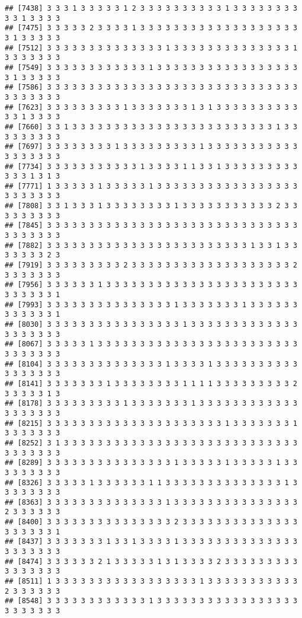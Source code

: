 \documentclass[
]{article}
\begin{document}
\begin{verbatim}
## [7438] 3 3 3 1 3 3 3 3 3 1 2 3 3 3 3 3 3 3 3 3 3 1 3 3 3 3 3 3 3 3 3 3 1 3 3 3 3
## [7475] 3 3 3 3 3 2 3 3 3 3 1 3 3 3 3 3 3 3 3 3 3 3 3 3 3 3 3 3 3 3 3 1 3 3 3 3 3
## [7512] 3 3 3 3 3 3 3 3 3 3 3 3 3 3 1 3 3 3 3 3 3 3 3 3 3 3 3 3 3 1 3 3 3 3 3 3 3
## [7549] 3 3 3 3 3 3 3 3 3 3 3 3 1 3 3 3 3 3 3 3 3 3 3 3 3 3 3 3 3 3 3 1 3 3 3 3 3
## [7586] 3 3 3 3 3 3 3 3 3 3 3 3 3 3 3 3 3 3 3 3 3 3 3 3 3 3 3 3 3 3 3 3 3 3 3 3 3
## [7623] 3 3 3 3 3 3 3 3 3 1 3 3 3 3 3 3 3 1 3 1 3 3 3 3 3 3 3 3 3 3 3 3 1 3 3 3 3
## [7660] 3 3 1 3 3 3 3 3 3 3 3 3 3 3 3 3 3 3 3 3 3 3 3 3 3 3 3 1 3 3 3 3 3 3 3 3 3
## [7697] 3 3 3 3 3 3 3 3 1 3 3 3 3 3 3 3 3 3 1 3 3 3 3 3 3 3 3 3 3 3 3 3 3 3 3 3 3
## [7734] 3 3 3 3 3 3 3 3 3 3 3 1 3 3 3 3 1 1 3 3 1 3 3 3 3 3 3 3 3 3 3 3 3 1 3 1 3
## [7771] 1 3 3 3 3 3 1 3 3 3 3 3 1 3 3 3 3 3 3 3 3 3 3 3 3 3 3 3 3 3 3 3 3 3 3 3 3
## [7808] 3 3 1 3 3 3 1 3 3 3 3 3 3 3 3 1 3 3 3 3 3 3 3 3 3 3 3 2 3 3 3 3 3 3 3 3 3
## [7845] 3 3 3 3 3 3 3 3 3 3 3 3 3 3 3 3 3 3 3 3 3 3 3 3 3 3 3 3 3 3 3 3 3 3 3 3 3
## [7882] 3 3 3 3 3 3 3 3 3 3 3 3 3 3 3 3 3 3 3 3 3 3 3 3 1 3 3 1 3 3 3 3 3 3 3 2 3
## [7919] 3 3 3 3 3 3 3 3 3 2 3 3 3 3 3 3 3 3 3 3 3 3 3 3 3 3 3 3 3 2 3 3 3 3 3 3 3
## [7956] 3 3 3 3 3 3 1 3 3 3 3 3 3 3 3 3 3 3 3 3 3 3 3 3 3 3 3 3 3 3 3 3 3 3 3 3 1
## [7993] 3 3 3 3 3 3 3 3 3 3 3 3 3 3 3 1 3 3 3 3 3 3 3 1 3 3 3 3 3 3 3 3 3 3 3 3 1
## [8030] 3 3 3 3 3 3 3 3 3 3 3 3 3 3 3 3 1 3 3 3 3 3 3 3 3 3 3 3 3 3 3 3 3 3 3 3 3
## [8067] 3 3 3 3 3 1 3 3 3 3 3 3 3 3 3 3 3 3 3 3 3 3 3 3 3 3 3 3 3 3 3 3 3 3 3 3 3
## [8104] 3 3 3 3 3 3 3 3 3 3 3 3 3 3 1 3 3 3 3 1 3 3 3 3 3 3 3 3 3 3 3 3 3 3 3 3 3
## [8141] 3 3 3 3 3 3 3 1 3 3 3 3 3 3 3 3 1 1 1 1 3 3 3 3 3 3 3 3 3 2 3 3 3 3 3 1 3
## [8178] 3 3 3 3 3 3 3 3 3 1 3 3 3 3 3 3 3 1 3 3 3 3 3 3 3 3 3 3 3 3 3 3 3 3 3 3 3
## [8215] 3 3 3 3 3 3 3 3 3 3 3 3 3 3 3 3 3 3 3 3 3 1 3 3 3 3 3 3 3 1 3 3 3 3 3 3 3
## [8252] 3 1 3 3 3 3 3 3 3 3 3 3 3 3 3 3 3 3 3 3 3 3 3 3 3 3 3 3 3 3 3 3 3 3 3 3 3
## [8289] 3 3 3 3 3 3 3 3 3 3 3 3 3 3 3 1 3 3 3 3 3 1 3 3 3 3 3 1 3 3 3 3 3 3 3 3 3
## [8326] 3 3 3 3 3 1 3 3 3 3 3 3 1 1 3 3 3 3 3 3 3 3 3 3 3 3 3 3 1 3 3 3 3 3 3 3 3
## [8363] 3 3 3 3 3 3 3 3 3 3 3 3 3 3 1 3 3 3 3 3 3 3 3 3 3 3 3 3 3 3 2 3 3 3 3 3 3
## [8400] 3 3 3 3 3 3 3 3 3 3 3 3 3 3 3 2 3 3 3 3 3 3 3 3 3 3 3 3 3 3 3 3 3 3 3 3 1
## [8437] 3 3 3 3 3 3 3 1 3 3 1 3 3 3 3 1 3 3 3 3 3 3 3 3 3 3 3 3 3 3 3 3 3 3 3 3 3
## [8474] 3 3 3 3 3 3 2 1 3 3 3 3 3 1 3 1 3 3 3 3 2 3 3 3 3 3 3 3 3 3 3 3 3 3 3 3 3
## [8511] 1 3 3 3 3 3 3 3 3 3 3 3 3 3 3 3 3 3 1 3 3 3 3 3 3 3 3 3 3 3 2 3 3 3 3 3 3
## [8548] 3 3 3 3 3 3 3 3 3 3 3 3 1 3 3 3 3 3 3 3 3 3 3 3 3 3 3 3 3 3 3 3 3 3 3 3 3

\end{verbatim}
\end{document}
